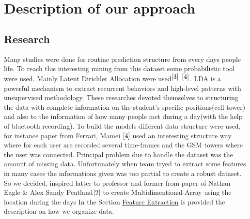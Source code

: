 \documentclass[paper=letter, fontsize=12pt]{article}
\begin{document}
\section{Description of our approach}
\subsection{Research}
Many studies 
  were done for routine prediction structure from every days people life. 
To reach this interesting mining from this dataset some probabilistic tool were used.
Mainly Latent Dirichlet Allocation were used$^{\ref{3}}$ $^{\ref{4}}$. LDA is a
powerful mechanism to extract recurrent behaviors and high-level patterns with unsupervised methodology.\newline 
These researches devoted themselves to structuring the data with complete information on the student's specific positions(cell tower) and also to the information of how many people met during a day(with the help of bluetooth recording).
To build the models different data structure were used, for instance paper from Ferrari, Mamei ${\ref{4}}$ used an interesting structure way where for each user are recorded several time-frames and the GSM towers where the user was connected. \newline 
Principal problem due to handle the dataset was the amount of missing data.
Unfortunately when team tryed to extract some features in many cases the informations given was too partial to create a robust dataset.
So we decided, inspired latter to professor and former from paper of Nathan Eagle \& Alex Sandy Pentland${\ref{2}}$ to create Multidimentional-Array using the location during the days
In the Section \hyperref[sec:featureextraction]{Feature Extraction} is provided the description on how we organize data.
\end{document}

